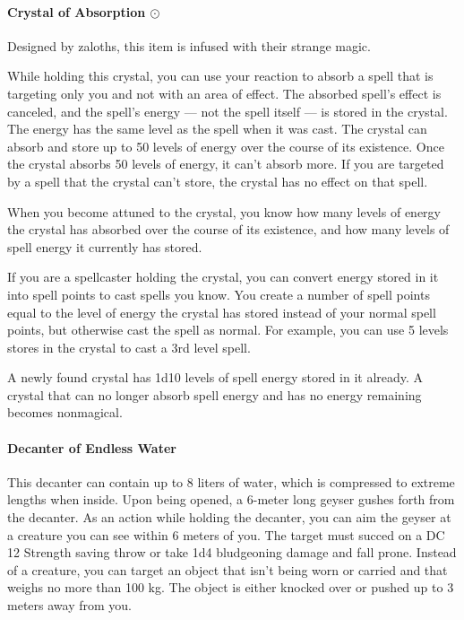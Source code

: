\paragraph{Crystal of Absorption $\odot$}
    Designed by zaloths, this item is infused with their strange magic.

    While holding this crystal, you can use your reaction to absorb a spell that is targeting only you and not with an area of effect.
    The absorbed spell's effect is canceled, and the spell's energy --- not the spell itself --- is stored in the crystal.
    The energy has the same level as the spell when it was cast.
    The crystal can absorb and store up to 50 levels of energy over the course of its existence.
    Once the crystal absorbs 50 levels of energy, it can't absorb more.
    If you are targeted by a spell that the crystal can't store, the crystal has no effect on that spell.

    When you become attuned to the crystal, you know how many levels of energy the crystal has absorbed over the course of its existence, and how many levels of spell energy it currently has stored.

    If you are a spellcaster holding the crystal, you can convert energy stored in it into spell points to cast spells you know.
    You create a number of spell points equal to the level of energy the crystal has stored instead of your normal spell points, but otherwise cast the spell as normal.
    For example, you can use 5 levels stores in the crystal to cast a 3rd level spell.

    A newly found crystal has 1d10 levels of spell energy stored in it already.
    A crystal that can no longer absorb spell energy and has no energy remaining becomes nonmagical.
\paragraph{Decanter of Endless Water}
    This decanter can contain up to 8 liters of water, which is compressed to extreme lengths when inside.
    Upon being opened, a 6-meter long geyser gushes forth from the decanter.
    As an action while holding the decanter, you can aim the geyser at a creature you can see within 6 meters of you.
    The target must succed on a DC 12 Strength saving throw or take 1d4 bludgeoning damage and fall prone.
    Instead of a creature, you can target an object that isn't being worn or carried and that weighs no more than 100 kg.
    The object is either knocked over or pushed up to 3 meters away from you.


